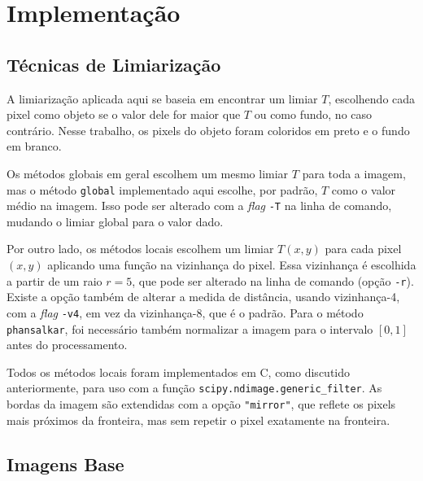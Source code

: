 \section{Implementação} \label{sec:impl}

\subsection{Técnicas de Limiarização}

    A limiarização aplicada aqui se baseia em encontrar um limiar $T$, escolhendo cada pixel como objeto se o valor dele for maior que $T$ ou como fundo, no caso contrário. Nesse trabalho, os pixels do objeto foram coloridos em preto e o fundo em branco.

    Os métodos globais em geral escolhem um mesmo limiar $T$ para toda a imagem, mas o método \texttt{global} implementado aqui escolhe, por padrão, $T$ como o valor médio na imagem. Isso pode ser alterado com a \textit{flag} \texttt{-T} na linha de comando, mudando o limiar global para o valor dado.

    Por outro lado, os métodos locais escolhem um limiar $T(x, y)$ para cada pixel $(x, y)$ aplicando uma função na vizinhança do pixel. Essa vizinhança é escolhida a partir de um raio $r = 5$, que pode ser alterado na linha de comando (opção \texttt{-r}). Existe a opção também de alterar a medida de distância, usando vizinhança-4, com a \textit{flag} \texttt{-v4}, em vez da vizinhança-8, que é o padrão. Para o método \texttt{phansalkar}, foi necessário também normalizar a imagem para o intervalo $[0, 1]$ antes do processamento.

    Todos os métodos locais foram implementados em C, como discutido anteriormente, para uso com a função \texttt{scipy.ndimage.generic_filter}. As bordas da imagem são extendidas com a opção \texttt{"mirror"}, que reflete os pixels mais próximos da fronteira, mas sem repetir o pixel exatamente na fronteira.

\begingroup
\subsection{Imagens Base} \label{sec:imgbase}



\endgroup


